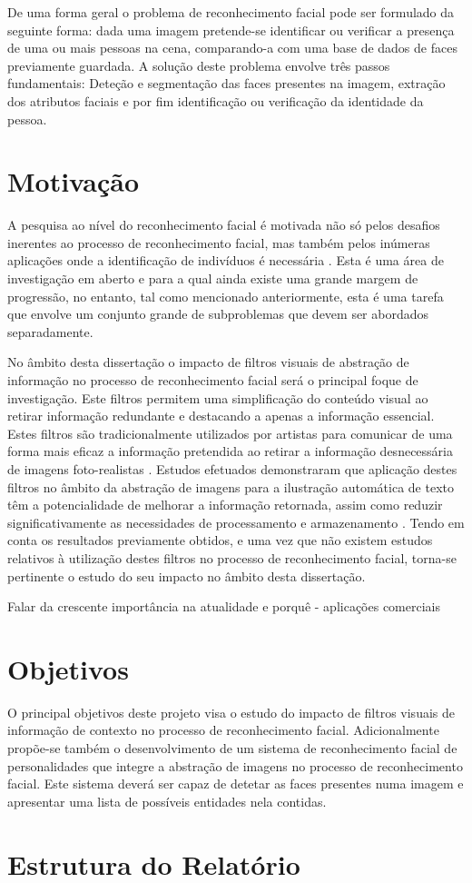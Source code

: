 De uma forma geral o problema de reconhecimento facial pode ser formulado da seguinte forma: dada uma imagem pretende-se identificar ou verificar a presença de uma ou mais pessoas na cena, comparando-a com uma base de dados de faces previamente guardada. A solução deste problema envolve três passos fundamentais: Deteção e segmentação das faces presentes na imagem, extração dos atributos faciais e por fim identificação ou verificação da identidade da pessoa.\citep{Zhao2003}
	

\section{Motivação} \label{sec:motivation}
A pesquisa ao nível do reconhecimento facial é motivada não só pelos desafios inerentes ao processo de reconhecimento facial, mas também pelos inúmeras aplicações onde a identificação de indivíduos é necessária \citep{Li2011}. Esta é uma área de investigação em aberto e para a qual ainda existe uma grande margem de progressão, no entanto, tal como mencionado anteriormente, esta é uma tarefa que envolve um conjunto grande de subproblemas que devem ser abordados separadamente.

No âmbito desta dissertação o impacto de filtros visuais de abstração de informação no processo de reconhecimento facial será o principal foque de investigação. Este filtros permitem uma simplificação do conteúdo visual ao retirar informação redundante e destacando a apenas a informação essencial. Estes filtros são tradicionalmente utilizados por artistas para comunicar de uma forma mais eficaz a informação pretendida ao retirar a informação desnecessária de imagens foto-realistas \citep{Kyprianidis2009}. Estudos efetuados demonstraram que aplicação destes filtros no âmbito da abstração de imagens para a ilustração automática de texto têm a potencialidade de melhorar a informação retornada, assim como reduzir significativamente as necessidades de processamento e armazenamento \citep{Coelho2012}. Tendo em conta os resultados previamente obtidos, e uma vez que não existem estudos relativos à utilização destes filtros no processo de reconhecimento facial, torna-se pertinente o estudo do seu impacto no âmbito desta dissertação.

Falar da crescente importância na atualidade e porquê - aplicações comerciais

\section{Objetivos} \label{sec:objetivosintro}
O principal objetivos deste projeto visa o estudo do impacto de filtros visuais de informação de contexto no processo de reconhecimento facial.
Adicionalmente propõe-se também o desenvolvimento de um sistema de reconhecimento facial de personalidades que integre a abstração de imagens no processo de reconhecimento facial. Este sistema deverá ser capaz de detetar as faces presentes numa imagem e apresentar uma lista de possíveis entidades nela contidas.

\section{Estrutura do Relatório} \label{sec:struct}
